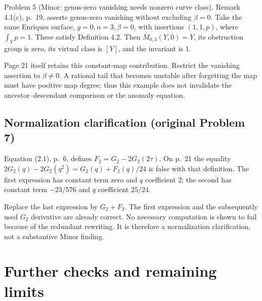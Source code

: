 \documentclass[10pt]{article}
\begin{document}
Problem 5 (Minor: genus-zero vanishing needs nonzero curve class).  Remark 4.1(c), p. 19, asserts genus-zero vanishing without excluding \(\beta=0\). Take the same Enriques surface, \(g=0,n=3,\beta=0\), with insertions \((1,1,p)\), where \(\int_Yp=1\). These satisfy Definition 4.2. Then \(\overline M_{0,3}(Y,0)=Y\), its obstruction group is zero, its virtual class is \([Y]\), and the invariant is \(1\).\par
Page 21 itself retains this constant-map contribution. Restrict the vanishing assertion to \(\beta\ne0\). A rational tail that becomes unstable after forgetting the map must have positive map degree; thus this example does not invalidate the ancestor–descendant comparison or the anomaly equation.\par
\subsection*{Normalization clarification (original Problem 7)}
Equation (2.1), p. 6, defines \(F_2=G_2-2G_2(2\tau)\). On p. 21 the equality \(2G_2(q)-2G_2(q^2)=G_2(q)+F_2(q)/24\) is false with that definition. The first expression has constant term zero and \(q\) coefficient \(2\); the second has constant term \(-23/576\) and \(q\) coefficient \(25/24\).\par
Replace the last expression by \(G_2+F_2\). The first expression and the subsequently used \(G_2\) derivative are already correct. No necessary computation is shown to fail because of the redundant rewriting. It is therefore a normalization clarification, not a substantive Minor finding.\par
\section*{Further checks and remaining limits}
\end{document}
